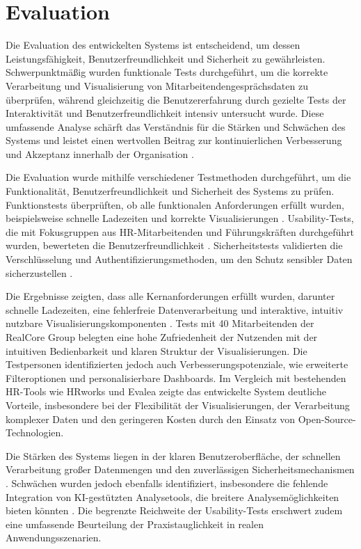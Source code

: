 \chapter{Evaluation}
\label{chap:evaluation}

Die Evaluation des entwickelten Systems ist entscheidend, um dessen Leistungsfähigkeit, Benutzerfreundlichkeit und Sicherheit zu gewährleisten. Schwerpunktmäßig wurden funktionale Tests durchgeführt, um die korrekte Verarbeitung und Visualisierung von Mitarbeitendengesprächsdaten zu überprüfen, während gleichzeitig die Benutzererfahrung durch gezielte Tests der Interaktivität und Benutzerfreundlichkeit intensiv untersucht wurde. Diese umfassende Analyse schärft das Verständnis für die Stärken und Schwächen des Systems und leistet einen wertvollen Beitrag zur kontinuierlichen Verbesserung und Akzeptanz innerhalb der Organisation \cite{akinnuwesi2012framework, achter2016bigdata, angrave2016hr}.

Die Evaluation wurde mithilfe verschiedener Testmethoden durchgeführt, um die Funktionalität, Benutzerfreundlichkeit und Sicherheit des Systems zu prüfen. Funktionstests überprüften, ob alle funktionalen Anforderungen erfüllt wurden, beispielsweise schnelle Ladezeiten und korrekte Visualisierungen \cite{kirk2019datavisualisation}. Usability-Tests, die mit Fokusgruppen aus HR-Mitarbeitenden und Führungskräften durchgeführt wurden, bewerteten die Benutzerfreundlichkeit \cite{heikkila2018quantified}. Sicherheitstests validierten die Verschlüsselung und Authentifizierungsmethoden, um den Schutz sensibler Daten sicherzustellen \cite{van2011employee}.

Die Ergebnisse zeigten, dass alle Kernanforderungen erfüllt wurden, darunter schnelle Ladezeiten, eine fehlerfreie Datenverarbeitung und interaktive, intuitiv nutzbare Visualisierungskomponenten \cite{watson2014bigdata}. Tests mit 40 Mitarbeitenden der RealCore Group belegten eine hohe Zufriedenheit der Nutzenden mit der intuitiven Bedienbarkeit und klaren Struktur der Visualisierungen. Die Testpersonen identifizierten jedoch auch Verbesserungspotenziale, wie erweiterte Filteroptionen und personalisierbare Dashboards. Im Vergleich mit bestehenden HR-Tools wie HRworks und Evalea zeigte das entwickelte System deutliche Vorteile, insbesondere bei der Flexibilität der Visualisierungen, der Verarbeitung komplexer Daten und den geringeren Kosten durch den Einsatz von Open-Source-Technologien.

Die Stärken des Systems liegen in der klaren Benutzeroberfläche, der schnellen Verarbeitung großer Datenmengen und den zuverlässigen Sicherheitsmechanismen \cite{heer2012interactive, chen2012interactive, boneder2023evaluation}. Schwächen wurden jedoch ebenfalls identifiziert, insbesondere die fehlende Integration von KI-gestützten Analysetools, die breitere Analysemöglichkeiten bieten könnten \cite{tambe2019artificial}. Die begrenzte Reichweite der Usability-Tests erschwert zudem eine umfassende Beurteilung der Praxistauglichkeit in realen Anwendungsszenarien.

